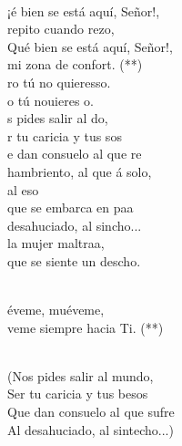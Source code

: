 \documentclass[12pt]{article}
\begin{document}
\begin{multicols*}{2}
\begin{cancion}%
	  \\
	¡é bien se está aquí, Señor!, \\
	repito cuando rezo,\\
	Qué bien se está aquí, Señor!,\\
	mi zona de confort. (**)\\
\jump
	ro tú no quieresso.\\
	o tú nouieres o.\\
\jump
	s pides salir al do,\\
	r tu caricia y tus sos\\
	e dan consuelo al que re\\
	 hambriento, al que á solo, \\
	al eso\\
	 que se embarca en paa\\
	 desahuciado, al sincho...\\
	la mujer maltraa,\\
	 que se siente un descho.\\\jump\\
	\begin{chorus}%
	éveme, muéveme,\\
	veme siempre hacia Ti. (**) \\
	\end{chorus}%
	\jump\\
(Nos pides salir al mundo,\\
 Ser tu caricia y tus besos\\
 Que dan consuelo al que sufre\\
 Al desahuciado, al sintecho...)\\
\end{cancion}%


\end{multicols*}
\end{document}
